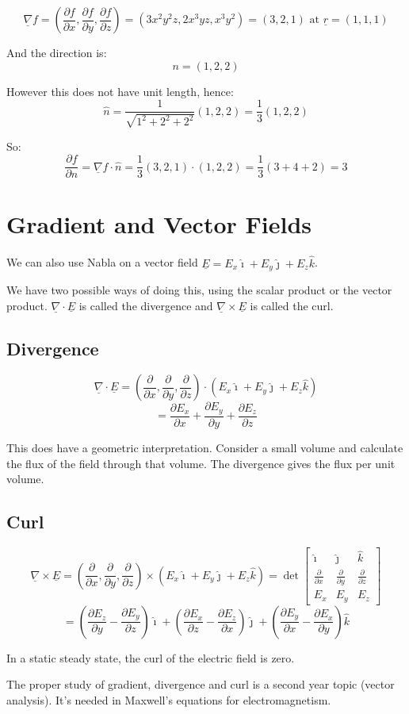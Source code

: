 \[
    \underline{\nabla} f = \left(\frac{\partial f}{\partial x}, \frac{\partial f}{\partial y}, \frac{\partial f}{\partial z}\right) = (3x^2y^2z, 2x^3yz, x^3y^2) = (3, 2, 1) \text{ at } \underline{r} = (1, 1, 1)
\]

And the direction is:
\[
    n = (1, 2, 2)
\]

However this does not have unit length, hence:
\[
    \hat{n} = \frac{1}{\sqrt{1^2 + 2^2 + 2^2}} (1, 2, 2) = \frac{1}{3}(1, 2, 2)
\]

So:
\[
    \frac{\partial f}{\partial n} = \underline{\nabla}f \cdot \hat{n} = \frac{1}{3} (3, 2, 1) \cdot (1, 2, 2) = \frac{1}{3}(3 + 4 + 2) = 3
\]

\section{Gradient and Vector Fields}
We can also use Nabla on a vector field $\underline{E} = E_x \hat{\imath} + E_y \hat{\jmath} + E_z \hat{k}$.

We have two possible ways of doing this, using the scalar product or the vector product. $\underline{\nabla} \cdot \underline{E}$ is called the divergence and $\underline{\nabla} \times \underline{E}$ is called the curl.

\subsection{Divergence}
\[
    \underline{\nabla} \cdot \underline{E} = \left(\frac{\partial}{\partial x}, \frac{\partial}{\partial y}, \frac{\partial}{\partial z} \right) \cdot \left(E_x \hat{\imath} + E_y \hat{\jmath} + E_z \hat{k} \right)
\]
\[
    = \frac{\partial E_x}{\partial x} + \frac{\partial E_y}{\partial y} + \frac{\partial E_z}{\partial z}
\]

This does have a geometric interpretation. Consider a small volume and calculate the flux of the field through that volume. The divergence gives the flux per unit volume.

\subsection{Curl}
\[
    \underline{\nabla} \times \underline{E} = \left(\frac{\partial}{\partial x}, \frac{\partial}{\partial y}, \frac{\partial}{\partial z} \right) \times \left(E_x \hat{\imath} + E_y \hat{\jmath} + E_z \hat{k} \right) = \det \begin{bmatrix}
        \hat{\imath} & \hat{\jmath} & \hat{k} \\
        \frac{\partial}{\partial x} & \frac{\partial}{\partial y} & \frac{\partial}{\partial z} \\
        E_x & E_y & E_z
    \end{bmatrix}
\]
\[
    = \left(\frac{\partial E_z}{\partial y} - \frac{\partial E_y}{\partial z}\right) \hat{\imath} + \left(\frac{\partial E_x}{\partial z} - \frac{\partial E_z}{\partial x}\right) \hat{\jmath} + \left(\frac{\partial E_y}{\partial x} - \frac{\partial E_x}{\partial y}\right) \hat{k}
\]

In a static steady state, the curl of the electric field is zero.

The proper study of gradient, divergence and curl is a second year topic (vector analysis). It's needed in Maxwell's equations for electromagnetism.
